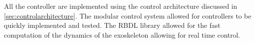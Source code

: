 All the controller are implemented using the control architecture discussed in \autoref{sec:controlarchitecture}. The modular control system allowed for controllers to be quickly implemented and tested. The RBDL library allowed for the fast computation of the dynamics of the exoskeleton allowing for real time control. 



